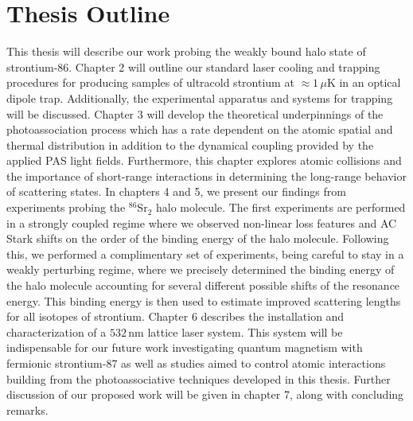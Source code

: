 \section{Thesis Outline} \label{sec:outline}
This thesis will describe our work probing the weakly bound halo state of strontium-86.
Chapter 2 will outline our standard laser cooling and trapping procedures for producing samples of ultracold strontium at $\approx1\,\mu$K in an optical dipole trap. 
Additionally, the experimental apparatus and systems for trapping will be discussed.
Chapter 3 will develop the theoretical underpinnings of the photoassociation process which has a rate dependent on the atomic spatial and thermal distribution in addition to the dynamical coupling provided by the applied PAS light fields.
Furthermore, this chapter explores atomic collisions and the importance of short-range interactions in determining the long-range behavior of scattering states.
In chapters 4 and 5, we present our findings from experiments probing the $^{86}$Sr$_2$ halo molecule.
The first experiments are performed in a strongly coupled regime where we observed non-linear loss features and AC Stark shifts on the order of the binding energy of the halo molecule.
Following this, we performed a complimentary set of experiments, being careful to stay in a weakly perturbing regime, where we precisely determined the binding energy of the halo molecule accounting for several different possible shifts of the resonance energy.
This binding energy is then used to estimate improved scattering lengths for all isotopes of strontium.
Chapter 6 describes the installation and characterization of a $532$\,nm lattice laser system.
This system will be indispensable for our future work investigating quantum magnetism with fermionic strontium-87 as well as studies aimed to control atomic interactions building from the photoassociative techniques developed in this thesis.
Further discussion of our proposed work will be given in chapter 7, along with concluding remarks.









